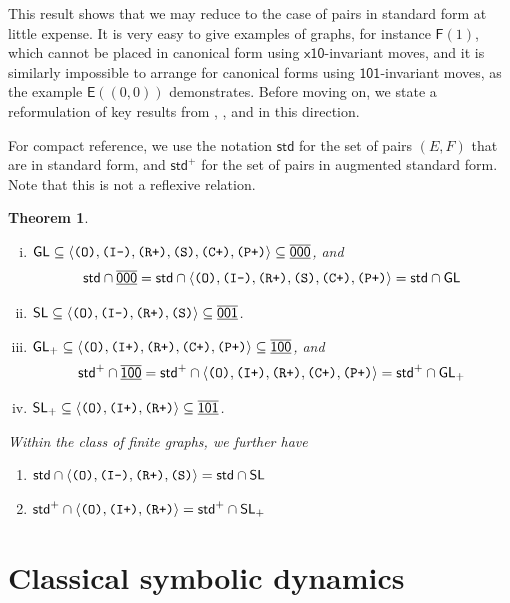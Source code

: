 \documentclass[12pt]{amsbook}%
\newtheorem{theor}{Theorem}[section]
\theoremstyle{defin}
\theoremstyle{remark}
\numberwithin{equation}{chapter}
\numberwithin{theor}{section}
\newcommand{\xyz}[1]{\mbox{$\mathsf{#1}$}}
\newcommand{\xyzrel}[1]{\mbox{$\overline{\underline{\mathsf{ #1}}}$}}
\newcommand{\IIIm}{\mbox{\texttt{\textup{(I-)}}}}
\newcommand{\IIIp}{\mbox{\texttt{\textup{(I+)}}}}
\newcommand{\OOO}{\mbox{\texttt{\textup{(O)}}}}
\newcommand{\CCCp}{\mbox{\texttt{\textup{(C+)}}}}
\newcommand{\RRRp}{\mbox{\texttt{\textup{(R+)}}}}
\newcommand{\PPPp}{\mbox{\texttt{\textup{(P+)}}}}
\newcommand{\SSS}{\mbox{\texttt{\textup{(S)}}}}
\newcommand{\standard}{\mathsf{std}}
\newcommand{\standardp}{\mathsf{std}^+}
\newcommand{\GF}{{\mathsf F}}
\newcommand{\GC}{{\mathsf E}}
\newcommand{\SL}{{\sf SL}}
\newcommand{\SLp}{\mbox{${\sf SL}_+$}}
\newcommand{\GL}{{\sf GL}}
\newcommand{\GLp}{\mbox{${\sf GL}_+$}}
\begin{document}
 This result shows that we may reduce to the case of pairs in standard form at little expense. It is very easy to give examples of graphs, for instance $\GF(1)$, which cannot be placed in canonical form using $\xyz{x10}$-invariant moves, and it is similarly impossible to arrange for canonical forms using $\xyz{101}$-invariant moves, as the example $\GC((0,0))$ demonstrates. Before moving on, we state a reformulation of key results from  \cite{segrerapws:gcgcfg}, \cite{segrerapws:ccuggs}, and \cite{seaseer:gciugc} in this direction.
 
For compact reference, we use the notation $\standard$\index{std@$\standard$} for the set of pairs $(E,F)$ that are in standard form, and $\standardp$\index{std+@$\standardp$} for the set of pairs  in augmented standard form. Note that this is not a reflexive relation.

 
 \begin{theor}\label{masterGLSL}\mbox{}
\begin{enumerate}[(i)]
\item $\GL\subseteq  \langle \OOO,\IIIm,\RRRp,\SSS,\CCCp,\PPPp\rangle\subseteq \xyzrel{000}$, and 
\[
\standard\cap \xyzrel{000}=\standard\cap \langle \OOO,\IIIm,\RRRp,\SSS,\CCCp,\PPPp\rangle=\standard\cap\GL
\]
\item $\SL\subseteq \langle \OOO,\IIIm,\RRRp,\SSS\rangle\subseteq \xyzrel{001}$.
\item $\GLp\subseteq \langle \OOO,\IIIp,\RRRp,\CCCp,\PPPp\rangle\subseteq \xyzrel{100}$, and 
\[
\standardp\cap \xyzrel{100}=\standardp\cap  \langle \OOO,\IIIp,\RRRp,\CCCp,\PPPp\rangle=\standardp\cap\GLp
\]
\item $\SLp\subseteq  \langle \OOO,\IIIp,\RRRp\rangle\subseteq \xyzrel{101}$.
\end{enumerate}
Within the class of finite graphs, we further have
\begin{enumerate}[(i')]\addtocounter{enumi}{1}
\item
$
\standard\cap \langle \OOO,\IIIm,\RRRp,\SSS\rangle=\standard\cap\SL
$
\addtocounter{enumi}{1}
\item
$
\standardp\cap \langle \OOO,\IIIp,\RRRp\rangle=\standardp\cap\SLp
$
\end{enumerate}

\end{theor}
 
 

 \section{Classical symbolic dynamics}\label{twosided}
 
\end{document}
